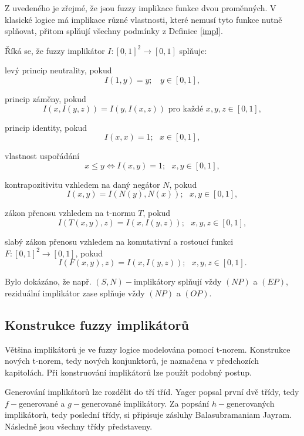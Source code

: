 Z uveden\'eho je z\v rejm\'e, \v ze jsou fuzzy implikace funkce dvou prom\v enn\'ych.
V klasick\'e logice m\'a implikace r\r uzn\'e vlastnosti, kter\'e nemus\'i tyto funkce nutn\v e spl\v novat, p\v ritom spl\v nuj\'i v\v sechny podm\'inky z Definice \ref{impl}.

\begin{definition}
\cite{Springer}
Říká se, že fuzzy implik\'ator $I:[0,1]^2 \rightarrow [0,1]$ spl\v nuje:
\begin{enumerate}
\item[(NP)] levý princip neutrality, pokud
$$I(1,y)=y; ~~~~y \in [0,1],$$
\item[(EP)] princip z\'aměny, pokud
$$I(x,I(y,z))=I(y,I(x,z)) \mbox{  pro ka\v zd\'e   } x,y,z \in [0,1],$$
\item[(IP)] princip identity, pokud
$$I(x,x) = 1; ~~~ x \in [0,1], $$
\item[(OP)] vlastnost uspořádání
$$x \leq y \iff I(x,y) =1; ~~~ x,y \in [0,1],$$
\item[(CP)] kontrapozitivitu vzhledem na dan\'y neg\'ator $N$, pokud
$$ I(x,y)=I(N(y),N(x)); ~~~ x,y \in [0,1],$$
 {\item[(LI)] z\'akon přenosu  vzhledem na  t-normu $T$, pokud
$$I(T(x, y), z) = I(x, I(y, z)); ~~~ x,y,z \in  [0, 1],$$
\item[(WLI)]  slab\'y z\'akon přenosu vzhledem na komutativní a
rostoucí funkci $F:
[0,1]^2 \to [0, 1]$, pokud
$$I(F(x, y), z) = I(x, I(y, z)); ~~~  x,y,z \in  [0, 1].$$}
\end{enumerate}
\end{definition}

\begin{remark}
    Bylo dok\'az\'ano, \v ze nap\v r. $(S,N)-$implikátory spl\v nují v\v zdy $(NP)$ a $(EP)$, reziduální implikátor zase spl\v nuje v\v zdy $(NP)$ a $(OP).$
\end{remark}

\subsection{Konstrukce fuzzy implikátor\r u}

Většina implikátor\r u je ve fuzzy logice modelována pomocí t-norem. Konstrukce nových t-norem, tedy nových konjunktor\r u, je naznačena v předchozích kapitolách. Při konstruování implikátor\r u lze použít podobný postup.

Generování implikátor\r u lze rozdělit do tří tříd. Yager popsal první dvě třídy, tedy $f-$generované a $g-$generované implikátory. Za popsání  $h-$generovaných implikátor\r u, tedy poslední třídy, si připisuje zásluhy Balasubramaniam Jayram. Následně jsou všechny třídy představeny.

